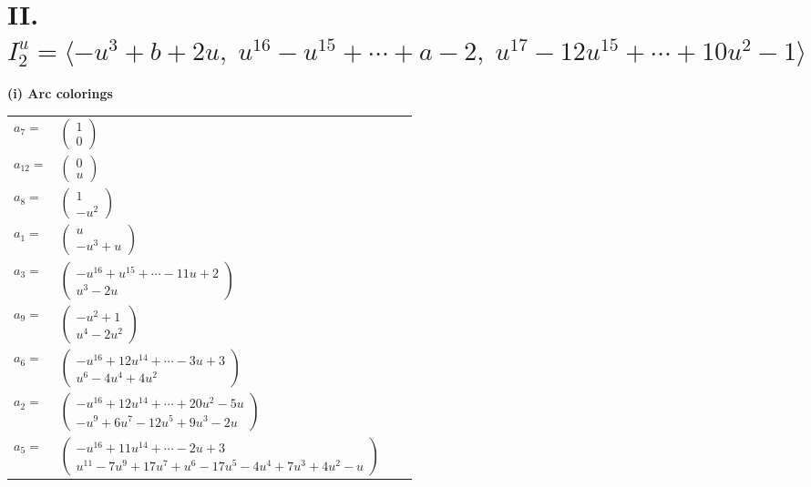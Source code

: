 \documentclass[1p]{elsarticle_modified}
\theoremstyle{definition}
\begin{document}
\centering \section*{II. $I^u_{2}= \langle - u^3+b+2 u,\;u^{16}- u^{15}+\cdots+a-2,\;u^{17}-12 u^{15}+\cdots+10 u^2-1 \rangle$}
\flushleft \textbf{(i) Arc colorings}\\
\begin{tabular}{m{7pt} m{180pt} m{7pt} m{180pt} }
\flushright $a_{7}=$&$\begin{pmatrix}1\\0\end{pmatrix}$ \\
\flushright $a_{12}=$&$\begin{pmatrix}0\\u\end{pmatrix}$ \\
\flushright $a_{8}=$&$\begin{pmatrix}1\\- u^2\end{pmatrix}$ \\
\flushright $a_{1}=$&$\begin{pmatrix}u\\- u^3+u\end{pmatrix}$ \\
\flushright $a_{3}=$&$\begin{pmatrix}- u^{16}+u^{15}+\cdots-11 u+2\\u^3-2 u\end{pmatrix}$ \\
\flushright $a_{9}=$&$\begin{pmatrix}- u^2+1\\u^4-2 u^2\end{pmatrix}$ \\
\flushright $a_{6}=$&$\begin{pmatrix}- u^{16}+12 u^{14}+\cdots-3 u+3\\u^6-4 u^4+4 u^2\end{pmatrix}$ \\
\flushright $a_{2}=$&$\begin{pmatrix}- u^{16}+12 u^{14}+\cdots+20 u^2-5 u\\- u^9+6 u^7-12 u^5+9 u^3-2 u\end{pmatrix}$ \\
\flushright $a_{5}=$&$\begin{pmatrix}- u^{16}+11 u^{14}+\cdots-2 u+3\\u^{11}-7 u^9+17 u^7+u^6-17 u^5-4 u^4+7 u^3+4 u^2- u\end{pmatrix}$ \\

\end{tabular}
\end{document}

